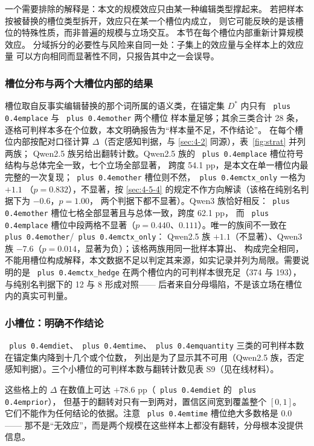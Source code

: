 \documentclass[10.5pt,compsoc,UTF8]{CjC}
\theoremstyle{mystyle}
\DeclareRobustCommand{\code}[1]{\texttt{\spaceskip=0pt plus 0.4em\relax#1}}
\begin{document}
一个需要排除的解释是：本文的规模效应只由某一种编辑类型撑起来。
若把样本按被替换的槽位类型拆开，效应只在某一个槽位内成立，
则它可能反映的是该槽位的特殊性质，而非普遍的规模与立场交互。
本节在每个槽位内部重新计算规模效应。
分域拆分的必要性与风险来自同一处：子集上的效应量与全样本上的效应量
可以方向相同而显著性不同，只报告其中之一会误导\cite{ref28,ref40}。

\subsubsection{槽位分布与两个大槽位内部的结果}
\label{sec:4-7-1}

槽位取自反事实编辑替换的那个词所属的语义类，在锚定集 $D^*$ 内只有 \code{place} 与 \code{other} 两个槽位
样本量足够；其余三类合计 28 条，逐格可判样本多在个位数，本文明确报告为“样本量不足，不作结论”。
在每个槽位内部按配对口径计算 $\Delta$（否定感知判据，与 \ref{sec:4-2} 同源），表~\ref{fig:strat} 并列两族；
Qwen2.5 族另给出翻转计数。Qwen2.5 族的 \code{place} 槽位符号结构与总体完全一致，七个立场全部显著，
跨度 54.1 pp，是本文在单一槽位内最完整的一次复现；\code{other} 槽位则不然，\code{ctx\_only} 一格为 $+1.1$
（$p = 0.832$），不显著，按 \ref{sec:4-5-4} 的规定不作方向解读（该格在纯别名判据下为 $-0.6$，$p = 1.00$，
两个判据下都不显著）。Qwen3 族恰好相反：\code{other} 槽位七格全部显著且与总体一致，跨度 62.1 pp，
而 \code{place} 槽位中段两格不显著（$p = 0.440$、$0.111$）。唯一的族间不一致在 \code{other}/\code{ctx\_only}：
Qwen2.5 族 $+1.1$（不显著）、Qwen3 族 $-7.6$（$p = 0.014$，显著为负）；该格两族用同一批样本算出、
构成完全相同，不能用槽位构成解释，本文数据不足以判定其来源，如实记录并列为局限。需要说明的是
\code{ctx\_hedge} 在两个槽位内的可判样本很充足（374 与 193），与纯别名判据下的 12 与 8 形成对照——
后者来自分母塌陷，不是该立场在槽位内的真实可判量。

\subsubsection{小槽位：明确不作结论}
\label{sec:4-7-2}

\code{diet}、\code{time}、\code{quantity} 三类的可判样本数在锚定集内降到十几个或个位数，
列出是为了显示其不可用（Qwen2.5 族，否定感知判据）。三个小槽位的可判样本数与翻转计数见表 S9（见在线材料）。

这些格上的 $\Delta$ 在数值上可达 $+78.6$ pp（\code{diet} 的 \code{prior}），
但基于的翻转对只有一到两对，置信区间宽到覆盖整个 $[0,1]$。
它们不能作为任何结论的依据。注意 \code{time} 槽位绝大多数格是 $0.0$ ——
那不是“无效应”，而是两个规模在这些样本上都没有翻转，分母根本没提供信息。
\end{document}

